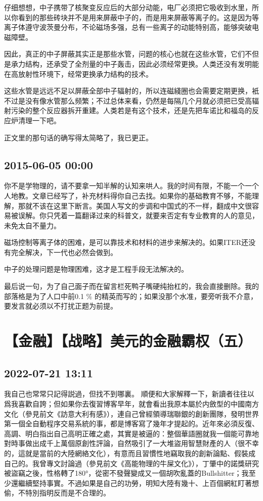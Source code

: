 \documentclass[twocolumn]{ctexart}
\begin{document}
仔细想想，中子携带了核聚变反应后的大部分动能，电厂必须把它吸收到水里，所以你看到的那些砖块并不是用来屏蔽中子的，而是用来屏蔽等离子的。这是因为等离子体遵守波茨曼分布，不论磁场多强，总有一些离子的动能特别高，能够突破电磁障壁。

因此，真正的中子屏蔽其实正是那些水管，问题的核心也就在这些水管，它们不但是承力结构，还承受了全剂量的中子轰击，因此必须经常更换。人类还没有发明能在高放射性环境下，经常更换承力结构的技术。

这些水管是远远不足以屏蔽全部中子辐射的，所以连磁綫圈也会需要定期更换，衹不过是没有像水管那么频繁；不过总体来看，仍然是每隔几个月就必须把已受高辐射污染的整个反应器拆开重建。人类若是有这个技术，还是先把车诺比和福岛的反应炉清理一下吧。

正文里的那句话的确写得太简略了，我已更正。\subsection*{2015-06-05 00:00}
你不是学物理的，请不要拿一知半解的认知来哄人。我的时间有限，不能一个一个人地教。文章已经写了，补充材料得你自己去找。如果你的基础教育不够，不能理解，那就不该在这里下断言。美国人写文的步调和中国式的不一样，翻成中文很容易被误解。你只凭着一篇翻译过来的科普文，就要来否定有专业教育的人的意见，未免太自不量力。

磁场控制等离子体的困难，是可以靠技术和材料的进步来解决的。如果ITER还没有完全解决，下一代也必然会做到。

中子的处理问题是物理困难，这才是工程手段无法解决的。

最后说一句，为了自己面子而在留言栏死鸭子嘴硬纯抬杠的，我会直接删除。我的部落格是为了人口中前0.1 \% 的精英而写的；如果没那个水准，要旁听我不介意，要发言就必须以不打扰正题为前提。\section*{【金融】【战略】美元的金融霸权（五）}
\subsection*{2022-07-21 13:11}

我自己也常常只記得説過，但找不到哪裏。
順便和大家解釋一下，新讀者往往以爲我喜歡自誇；但如果你去復習博客早年，就會看出我原本屬於内斂型的中國南方文化（參見前文《訪意大利有感》），連自己曾經領導瑞聯銀的創新團隊，發明世界第一個全自動程序交易系統的事，都是博客寫了幾年才提起的。近年來必須反復、高調、明白指出自己高明正確之處，其實是被逼的：整個華語圈就我一個能可靠地對時事做出成千上萬個原創性評論，自然吸引了一大堆盜用智慧財產的人（很不幸的，這就是當前的大陸網絡文化），有意而且習慣性地竊取我的創新論點、假裝成自己的。我曾專文討論過（參見前文《高能物理的牛屎文化》），丁肇中的諾獎研究被盜竊之後，性格轉了180°，從密不發聲變成又一個胡吹亂蓋的Bullshitter；我至少還繼續堅持事實。不過如果是自己的功勞，明知大陸有幾十、上百個網紅盯著想偷，不特別指明反而是不合理的。
\end{document}
